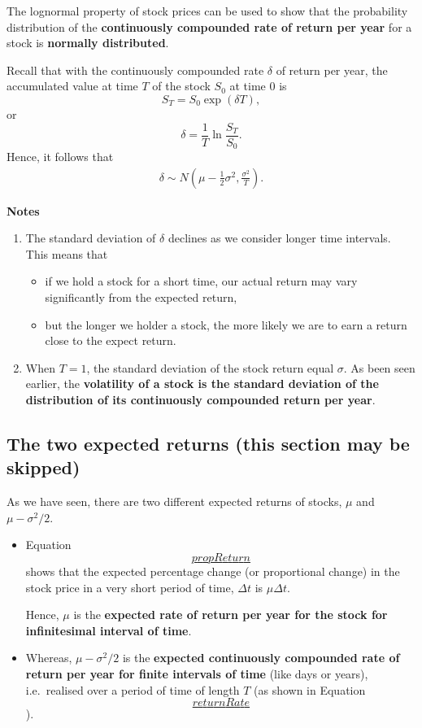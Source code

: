 \documentclass[landscape, 20pt]{extreport}
\theoremstyle{definition}
\theoremstyle{definition}
\theoremstyle{definition}
\theoremstyle{definition}
\theoremstyle{remark}
\begin{document}
The lognormal property of stock prices can be used to show that the
probability distribution of the \textbf{continuously compounded rate of return
per year} for a stock is \textbf{normally distributed}.

Recall that with the continuously compounded rate \(\delta\) of return per
year, the accumulated value at time \(T\) of the stock \(S_0\) at time 0 is
\[S_T = S_0 \exp(\delta T),\] or
\[\delta = \frac{1}{T} \ln \frac{S_T}{S_0}.\] Hence, it follows that
\[\begin{aligned}
\label{returnRate}
     \delta \sim N\left( \mu - \frac{1}{2}\sigma^2 , \frac{\sigma^2}{T} \right).\end{aligned}\]

\textbf{Notes}

\begin{enumerate}
\def\labelenumi{\arabic{enumi}.}
\item
  The standard deviation of \(\delta\) declines as we consider longer
  time intervals. This means that

  \begin{itemize}
  \item
    if we hold a stock for a short time, our actual return may vary
    significantly from the expected return,
  \item
    but the longer we holder a stock, the more likely we are to earn
    a return close to the expect return.
  \end{itemize}
\item
  When \(T = 1\), the standard deviation of the stock return equal
  \(\sigma\). As been seen earlier, the \textbf{volatility of a stock is the
  standard deviation of the distribution of its continuously
  compounded return per year}.
\end{enumerate}

\hypertarget{the-two-expected-returns-this-section-may-be-skipped}{%
\subsection{The two expected returns (this section may be skipped)}\label{the-two-expected-returns-this-section-may-be-skipped}}

As we have seen, there are two different expected returns of stocks,
\(\mu\) and \(\mu - \sigma^2/2\).

\begin{itemize}
\item
  Equation \protect\hyperlink{propReturn}{\[propReturn\]} shows that the expected percentage change
  (or proportional change) in the stock price in a very short period
  of time, \(\Delta t\) is \(\mu \Delta t\).

  Hence, \(\mu\) is the \textbf{expected rate of return per year for the stock
  for infinitesimal interval of time}.
\item
  Whereas, \(\mu - \sigma^2/2\) is the \textbf{expected continuously
  compounded rate of return per year for finite intervals of time}
  (like days or years), i.e.~realised over a period of time of length
  \(T\) (as shown in Equation
  \protect\hyperlink{returnRate}{\[returnRate\]}).
\end{itemize}
\end{document}
